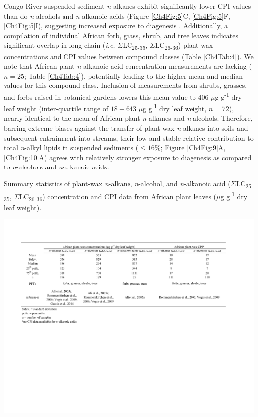 Congo River suspended sediment \textit{n}-alkanes exhibit significantly lower CPI values than do \textit{n}-alcohols and \textit{n}-alkanoic acids (Figure \ref{Ch4Fig:5}C, \ref{Ch4Fig:5}F, \ref{Ch4Fig:5}I), suggesting increased exposure to diagenesis \citep{Meyers:1993vwa}. Additionally, a compilation of individual African forb, grass, shrub, and tree leaves indicates significant overlap in long-chain (\textit{i.e.} $\Sigma$LC\textsubscript{25-35}, $\Sigma$LC\textsubscript{26-36}) plant-wax concentrations and CPI values between compound classes (Table \ref{Ch4Tab:4}). We note that African plant \textit{n}-alkanoic acid concentration measurements are lacking ($n = 25$; Table \ref{Ch4Tab:4}), potentially leading to the higher mean and median values for this compound class. Inclusion of measurements from shrubs, grasses, and forbs raised in botanical gardens \citep{Gao:2014bk} lowers this mean value to $406$ $\mu$g g\textsuperscript{-1} dry leaf weight (inter-quartile range of $18 - 643$ $\mu$g g\textsuperscript{-1} dry leaf weight, $n = 72$), nearly identical to the mean of African plant \textit{n}-alkanes and \textit{n}-alcohols. Therefore, barring extreme biases against the transfer of plant-wax \textit{n}-alkanes into soils and subsequent entrainment into streams, their low and stable relative contribution to total \textit{n}-alkyl lipids in suspended sediments ($\leq 16$\%; Figure \ref{Ch4Fig:9}A, \ref{Ch4Fig:10}A) agrees with relatively stronger exposure to diagenesis as compared to \textit{n}-alcohols and \textit{n}-alkanoic acids.

\begin{table}
	\caption[Leaf lipid distributions and concentrations from African plants]{Summary statistics of plant-wax \textit{n}-alkane, \textit{n}-alcohol, and \textit{n}-alkanoic acid ($\Sigma$LC\textsubscript{25-35}, $\Sigma$LC\textsubscript{26-36}) concentration and CPI data from African plant leaves ($\mu$g g\textsuperscript{-1} dry leaf weight).}
	\centering
		\includegraphics{Thesis_Tables/Ch4Tab4}
	\label{Ch4Tab:4} 
\end{table}

